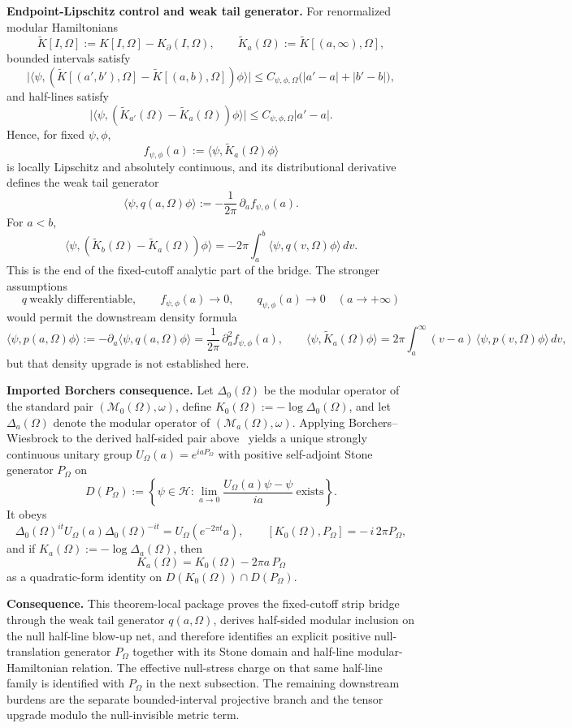 \textbf{Endpoint-Lipschitz control and weak tail generator.} For renormalized modular Hamiltonians
\[
\widetilde K[I,\Omega]
:=
K[I,\Omega]-K_\partial(I,\Omega),
\qquad
\widetilde K_a(\Omega):=\widetilde K[(a,\infty),\Omega],
\]
bounded intervals satisfy
\[
\bigl|
\langle\psi,(\widetilde K[(a',b'),\Omega]-\widetilde K[(a,b),\Omega])\phi\rangle
\bigr|
\le
C_{\psi,\phi,\Omega}\bigl(|a'-a|+|b'-b|\bigr),
\]
and half-lines satisfy
\[
\bigl|
\langle\psi,(\widetilde K_{a'}(\Omega)-\widetilde K_a(\Omega))\phi\rangle
\bigr|
\le
C_{\psi,\phi,\Omega}|a'-a|.
\]
Hence, for fixed \(\psi,\phi\),
\[
f_{\psi,\phi}(a):=\langle\psi,\widetilde K_a(\Omega)\phi\rangle
\]
is locally Lipschitz and absolutely continuous, and its distributional derivative defines the weak tail generator
\[
\langle\psi,q(a,\Omega)\phi\rangle
:=
-\frac{1}{2\pi}\,\partial_a f_{\psi,\phi}(a).
\]
For \(a<b\),
\[
\langle\psi,(\widetilde K_b(\Omega)-\widetilde K_a(\Omega))\phi\rangle
=
-2\pi\int_a^b \langle\psi,q(v,\Omega)\phi\rangle\,dv.
\]
This is the end of the fixed-cutoff analytic part of the bridge. The stronger assumptions
\[
q \ \text{weakly differentiable},
\qquad
f_{\psi,\phi}(a)\to 0,
\qquad
q_{\psi,\phi}(a)\to 0
\quad (a\to+\infty)
\]
would permit the downstream density formula
\[
\langle\psi,p(a,\Omega)\phi\rangle
:=
-\partial_a\langle\psi,q(a,\Omega)\phi\rangle
=
\frac{1}{2\pi}\,\partial_a^2 f_{\psi,\phi}(a),
\qquad
\langle\psi,\widetilde K_a(\Omega)\phi\rangle
=
2\pi\int_a^\infty (v-a)\,\langle\psi,p(v,\Omega)\phi\rangle\,dv,
\]
but that density upgrade is not established here.

\textbf{Imported Borchers consequence.} Let \(\Delta_0(\Omega)\) be the modular operator of the standard pair \((\mathcal M_0(\Omega),\omega)\), define \(K_0(\Omega):=-\log \Delta_0(\Omega)\), and let \(\Delta_a(\Omega)\) denote the modular operator of \((\mathcal M_a(\Omega),\omega)\). Applying Borchers--Wiesbrock to the derived half-sided pair above~\cite{wiesbrock93} yields a unique strongly continuous unitary group \(U_\Omega(a)=e^{iaP_\Omega}\) with positive self-adjoint Stone generator \(P_\Omega\) on
\[
D(P_\Omega)
:=
\left\{
\psi\in\mathcal H:
\lim_{a\to0}\frac{U_\Omega(a)\psi-\psi}{ia}\ \text{exists}
\right\}.
\]
It obeys
\[
\Delta_0(\Omega)^{it}U_\Omega(a)\Delta_0(\Omega)^{-it}
=
U_\Omega(e^{-2\pi t}a),
\qquad
[K_0(\Omega),P_\Omega]=-\,i\,2\pi P_\Omega,
\]
and if \(K_a(\Omega):=-\log \Delta_a(\Omega)\), then
\[
K_a(\Omega)=K_0(\Omega)-2\pi a\,P_\Omega
\]
as a quadratic-form identity on \(D(K_0(\Omega))\cap D(P_\Omega)\).

\textbf{Consequence.} This theorem-local package proves the fixed-cutoff strip bridge through the weak tail generator \(q(a,\Omega)\), derives half-sided modular inclusion on the null half-line blow-up net, and therefore identifies an explicit positive null-translation generator \(P_\Omega\) together with its Stone domain and half-line modular-Hamiltonian relation. The effective null-stress charge on that same half-line family is identified with \(P_\Omega\) in the next subsection. The remaining downstream burdens are the separate bounded-interval projective branch and the tensor upgrade modulo the null-invisible metric term.
